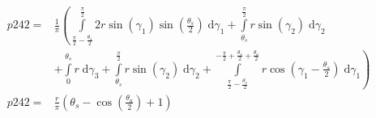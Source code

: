 \begin{align}
    p242 =&\frac{1}{\pi} \left(\int\limits_{\frac{\pi}{2} - \frac{\theta_{s}}{2}}^{\frac{\pi}{2}}2 r \sin{\left (\gamma_{1} \right )} \sin{\left (\frac{\theta_{s}}{2} \right )}\;\mathrm{d}\gamma_{1}+\int\limits_{\theta_{s}}^{\frac{\pi}{2}}r \sin{\left (\gamma_{2} \right )}\;\mathrm{d}\gamma_{2}\right.\\
 &\left.+\int\limits_{0}^{\theta_{s}}r\;\mathrm{d}\gamma_{3}+\int\limits_{\theta_{s}}^{\frac{\pi}{2}}r \sin{\left (\gamma_{2} \right )}\;\mathrm{d}\gamma_{2}+\int\limits_{\frac{\pi}{2} - \frac{\theta_{s}}{2}}^{- \frac{\pi}{2} + \frac{\theta_{s}}{2} + \frac{\theta_{a}}{2}}r \cos{\left (\gamma_{1} - \frac{\theta_{s}}{2} \right )}\;\mathrm{d}\gamma_{1}\right)\\
    p242 =& \frac{r}{\pi} \left(\theta_{s} - \cos{\left (\frac{\theta_{a}}{2} \right )} + 1\right)
\end{align}